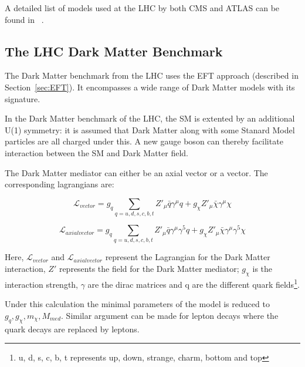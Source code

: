 A detailed list of models used at the LHC by both CMS and ATLAS can be found in ~\cite{Abercrombie_2020}.



\subsection{The LHC Dark Matter Benchmark}
\label{sec:LHCDM}
The Dark Matter benchmark from the LHC uses the EFT approach (described in Section~\ref{sec:EFT}). It encompasses a wide range of Dark Matter models with its signature. 

In the Dark Matter benchmark of the LHC, the SM is extented by an additional U(1) symmetry: it is assumed that Dark Matter along with some Stanard Model particles are all charged under this. A new gauge boson can thereby facilitate interaction between the SM and Dark Matter field. 

The Dark Matter mediator can either be an axial vector or a vector. The corresponding lagrangians are:

\begin{equation}
\mathcal{L}_{vector}= g_{q} \sum_{q=u,d,s,c,b,t} Z'_{\mu}\bar{q}\gamma^{\mu}q + g_{\chi}Z'_{\mu}\bar{\chi}\gamma^{\mu}\chi
\end{equation}

\begin{equation}
\mathcal{L}_{axial vector}= g_{q} \sum_{q=u,d,s,c,b,t} Z'_{\mu}\bar{q}\gamma^{\mu}\gamma^{5}q + g_{\chi}Z'_{\mu}\bar{\chi}\gamma^{\mu}\gamma^{5}\chi
\end{equation}

Here, $\mathcal{L}_{vector}$ and $\mathcal{L}_{axial vector}$ represent the Lagrangian for the Dark Matter interaction, $Z\prime$ represents the field for the Dark Matter mediator; $g_{\chi}$ is the interaction strength, $\gamma$ are the dirac matrices and q are the different quark fields\footnote{u, d, s, c, b, t represents up, down, strange, charm, bottom and top}.

Under this calculation the minimal parameters of the model is reduced to ${g_{q}, g_{\chi}, m_{\chi}, M_{med}}$. 
Similar argument can be made for lepton decays where the quark decays are replaced by leptons. 


